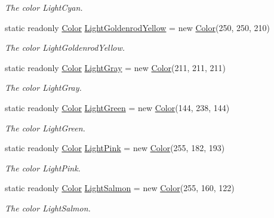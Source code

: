 \begin{DoxyCompactItemize}
\begin{DoxyCompactList}\small\item\em The color Light\-Cyan. \end{DoxyCompactList}\item 
static readonly \hyperlink{struct_tri_devs_1_1_tri_engine_1_1_color}{Color} \hyperlink{struct_tri_devs_1_1_tri_engine_1_1_color_a68cc5b73f18d3fe336459b442becb8f0}{Light\-Goldenrod\-Yellow} = new \hyperlink{struct_tri_devs_1_1_tri_engine_1_1_color}{Color}(250, 250, 210)
\begin{DoxyCompactList}\small\item\em The color Light\-Goldenrod\-Yellow. \end{DoxyCompactList}\item 
static readonly \hyperlink{struct_tri_devs_1_1_tri_engine_1_1_color}{Color} \hyperlink{struct_tri_devs_1_1_tri_engine_1_1_color_ac3a58bd4b33167b4f531f13c5a29f966}{Light\-Gray} = new \hyperlink{struct_tri_devs_1_1_tri_engine_1_1_color}{Color}(211, 211, 211)
\begin{DoxyCompactList}\small\item\em The color Light\-Gray. \end{DoxyCompactList}\item 
static readonly \hyperlink{struct_tri_devs_1_1_tri_engine_1_1_color}{Color} \hyperlink{struct_tri_devs_1_1_tri_engine_1_1_color_aba7bbdb83e025ba4a66c99daf2caec70}{Light\-Green} = new \hyperlink{struct_tri_devs_1_1_tri_engine_1_1_color}{Color}(144, 238, 144)
\begin{DoxyCompactList}\small\item\em The color Light\-Green. \end{DoxyCompactList}\item 
static readonly \hyperlink{struct_tri_devs_1_1_tri_engine_1_1_color}{Color} \hyperlink{struct_tri_devs_1_1_tri_engine_1_1_color_ad1dfc40698e9fc290f9045dfe0ccd26f}{Light\-Pink} = new \hyperlink{struct_tri_devs_1_1_tri_engine_1_1_color}{Color}(255, 182, 193)
\begin{DoxyCompactList}\small\item\em The color Light\-Pink. \end{DoxyCompactList}\item 
static readonly \hyperlink{struct_tri_devs_1_1_tri_engine_1_1_color}{Color} \hyperlink{struct_tri_devs_1_1_tri_engine_1_1_color_a0954f4529bbdbebc3890dc1fcb85211c}{Light\-Salmon} = new \hyperlink{struct_tri_devs_1_1_tri_engine_1_1_color}{Color}(255, 160, 122)
\begin{DoxyCompactList}\small\item\em The color Light\-Salmon. \end{DoxyCompactList}\item 

\end{DoxyCompactItemize}

